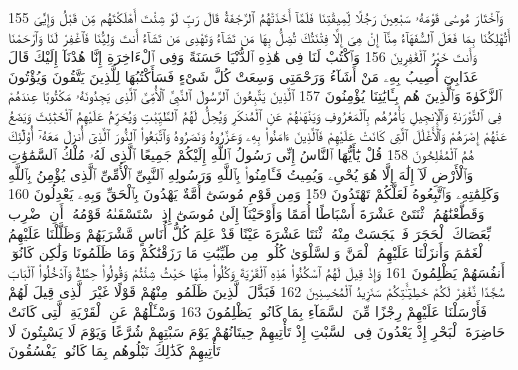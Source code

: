 {\tiny\colorbox{cl_aya}{155}} وَٱخْتَارَ مُوسَىٰ قَوْمَهُۥ سَبْعِينَ رَجُلًا لِّمِيقَٰتِنَا فَلَمَّآ أَخَذَتْهُمُ ٱلرَّجْفَةُ قَالَ رَبِّ لَوْ شِئْتَ أَهْلَكْتَهُم مِّن قَبْلُ وَإِيَّٰىَ أَتُهْلِكُنَا بِمَا فَعَلَ ٱلسُّفَهَآءُ مِنَّآ إِنْ هِىَ إِلَّا فِتْنَتُكَ تُضِلُّ بِهَا مَن تَشَآءُ وَتَهْدِى مَن تَشَآءُ أَنتَ وَلِيُّنَا فَٱغْفِرْ لَنَا وَٱرْحَمْنَا وَأَنتَ خَيْرُ ٱلْغَٰفِرِينَ
{\tiny\colorbox{cl_aya}{156}} وَٱكْتُبْ لَنَا فِى هَٰذِهِ ٱلدُّنْيَا حَسَنَةً وَفِى ٱلْءَاخِرَةِ إِنَّا هُدْنَآ إِلَيْكَ قَالَ عَذَابِىٓ أُصِيبُ بِهِۦ مَنْ أَشَآءُ وَرَحْمَتِى وَسِعَتْ كُلَّ شَىْءٍ فَسَأَكْتُبُهَا لِلَّذِينَ يَتَّقُونَ وَيُؤْتُونَ ٱلزَّكَوٰةَ وَٱلَّذِينَ هُم بِـَٔايَٰتِنَا يُؤْمِنُونَ
{\tiny\colorbox{cl_aya}{157}} ٱلَّذِينَ يَتَّبِعُونَ ٱلرَّسُولَ ٱلنَّبِىَّ ٱلْأُمِّىَّ ٱلَّذِى يَجِدُونَهُۥ مَكْتُوبًا عِندَهُمْ فِى ٱلتَّوْرَىٰةِ وَٱلْإِنجِيلِ يَأْمُرُهُم بِٱلْمَعْرُوفِ وَيَنْهَىٰهُمْ عَنِ ٱلْمُنكَرِ وَيُحِلُّ لَهُمُ ٱلطَّيِّبَٰتِ وَيُحَرِّمُ عَلَيْهِمُ ٱلْخَبَٰٓئِثَ وَيَضَعُ عَنْهُمْ إِصْرَهُمْ وَٱلْأَغْلَٰلَ ٱلَّتِى كَانَتْ عَلَيْهِمْ فَٱلَّذِينَ ءَامَنُوا۟ بِهِۦ وَعَزَّرُوهُ وَنَصَرُوهُ وَٱتَّبَعُوا۟ ٱلنُّورَ ٱلَّذِىٓ أُنزِلَ مَعَهُۥٓ أُو۟لَٰٓئِكَ هُمُ ٱلْمُفْلِحُونَ
{\tiny\colorbox{cl_aya}{158}} قُلْ يَٰٓأَيُّهَا ٱلنَّاسُ إِنِّى رَسُولُ ٱللَّهِ إِلَيْكُمْ جَمِيعًا ٱلَّذِى لَهُۥ مُلْكُ ٱلسَّمَٰوَٰتِ وَٱلْأَرْضِ لَآ إِلَٰهَ إِلَّا هُوَ يُحْىِۦ وَيُمِيتُ فَـَٔامِنُوا۟ بِٱللَّهِ وَرَسُولِهِ ٱلنَّبِىِّ ٱلْأُمِّىِّ ٱلَّذِى يُؤْمِنُ بِٱللَّهِ وَكَلِمَٰتِهِۦ وَٱتَّبِعُوهُ لَعَلَّكُمْ تَهْتَدُونَ
{\tiny\colorbox{cl_aya}{159}} وَمِن قَوْمِ مُوسَىٰٓ أُمَّةٌ يَهْدُونَ بِٱلْحَقِّ وَبِهِۦ يَعْدِلُونَ
{\tiny\colorbox{cl_aya}{160}} وَقَطَّعْنَٰهُمُ ٱثْنَتَىْ عَشْرَةَ أَسْبَاطًا أُمَمًا وَأَوْحَيْنَآ إِلَىٰ مُوسَىٰٓ إِذِ ٱسْتَسْقَىٰهُ قَوْمُهُۥٓ أَنِ ٱضْرِب بِّعَصَاكَ ٱلْحَجَرَ فَٱنۢبَجَسَتْ مِنْهُ ٱثْنَتَا عَشْرَةَ عَيْنًا قَدْ عَلِمَ كُلُّ أُنَاسٍ مَّشْرَبَهُمْ وَظَلَّلْنَا عَلَيْهِمُ ٱلْغَمَٰمَ وَأَنزَلْنَا عَلَيْهِمُ ٱلْمَنَّ وَٱلسَّلْوَىٰ كُلُوا۟ مِن طَيِّبَٰتِ مَا رَزَقْنَٰكُمْ وَمَا ظَلَمُونَا وَلَٰكِن كَانُوٓا۟ أَنفُسَهُمْ يَظْلِمُونَ
{\tiny\colorbox{cl_aya}{161}} وَإِذْ قِيلَ لَهُمُ ٱسْكُنُوا۟ هَٰذِهِ ٱلْقَرْيَةَ وَكُلُوا۟ مِنْهَا حَيْثُ شِئْتُمْ وَقُولُوا۟ حِطَّةٌ وَٱدْخُلُوا۟ ٱلْبَابَ سُجَّدًا نَّغْفِرْ لَكُمْ خَطِيٓـَٰٔتِكُمْ سَنَزِيدُ ٱلْمُحْسِنِينَ
{\tiny\colorbox{cl_aya}{162}} فَبَدَّلَ ٱلَّذِينَ ظَلَمُوا۟ مِنْهُمْ قَوْلًا غَيْرَ ٱلَّذِى قِيلَ لَهُمْ فَأَرْسَلْنَا عَلَيْهِمْ رِجْزًا مِّنَ ٱلسَّمَآءِ بِمَا كَانُوا۟ يَظْلِمُونَ
{\tiny\colorbox{cl_aya}{163}} وَسْـَٔلْهُمْ عَنِ ٱلْقَرْيَةِ ٱلَّتِى كَانَتْ حَاضِرَةَ ٱلْبَحْرِ إِذْ يَعْدُونَ فِى ٱلسَّبْتِ إِذْ تَأْتِيهِمْ حِيتَانُهُمْ يَوْمَ سَبْتِهِمْ شُرَّعًا وَيَوْمَ لَا يَسْبِتُونَ لَا تَأْتِيهِمْ كَذَٰلِكَ نَبْلُوهُم بِمَا كَانُوا۟ يَفْسُقُونَ
